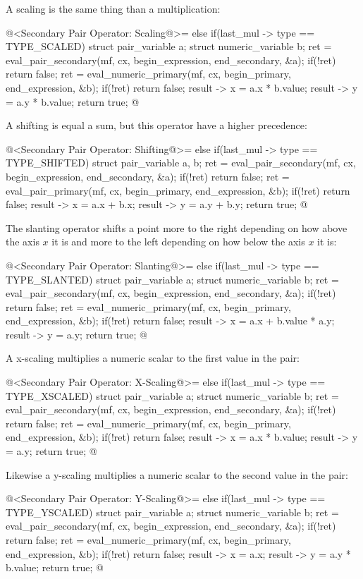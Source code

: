 A scaling is the same thing than a multiplication:

\iniciocodigo
@<Secondary Pair Operator: Scaling@>=
else if(last_mul -> type == TYPE_SCALED){
  struct pair_variable a;
  struct numeric_variable b;
  ret = eval_pair_secondary(mf, cx, begin_expression, end_secondary, &a);
  if(!ret)
    return false;
  ret = eval_numeric_primary(mf, cx, begin_primary, end_expression, &b);
  if(!ret)
    return false;
  result -> x = a.x * b.value;
  result -> y = a.y * b.value;
  return true;
}
@
\fimcodigo

A shifting is equal a sum, but this operator have a higher precedence:

\iniciocodigo
@<Secondary Pair Operator: Shifting@>=
else if(last_mul -> type == TYPE_SHIFTED){
  struct pair_variable a, b;
  ret = eval_pair_secondary(mf, cx, begin_expression, end_secondary, &a);
  if(!ret)
    return false;
  ret = eval_pair_primary(mf, cx, begin_primary, end_expression, &b);
  if(!ret)
    return false;
  result -> x = a.x + b.x;
  result -> y = a.y + b.y;
  return true;
}
@
\fimcodigo

The slanting operator shifts a point more to the right depending on
how above the axis $x$ it is and more to the left depending on how
below the axis $x$ it is:

\iniciocodigo
@<Secondary Pair Operator: Slanting@>=
else if(last_mul -> type == TYPE_SLANTED){
  struct pair_variable a;
  struct numeric_variable b;
  ret = eval_pair_secondary(mf, cx, begin_expression, end_secondary, &a);
  if(!ret)
    return false;
  ret = eval_numeric_primary(mf, cx, begin_primary, end_expression, &b);
  if(!ret)
    return false;
  result -> x = a.x + b.value * a.y;
  result -> y = a.y;
  return true;
}
@
\fimcodigo

A x-scaling multiplies a numeric scalar to the first value in the
pair:

\iniciocodigo
@<Secondary Pair Operator: X-Scaling@>=
else if(last_mul -> type == TYPE_XSCALED){
  struct pair_variable a;
  struct numeric_variable b;
  ret = eval_pair_secondary(mf, cx, begin_expression, end_secondary, &a);
  if(!ret)
    return false;
  ret = eval_numeric_primary(mf, cx, begin_primary, end_expression, &b);
  if(!ret)
    return false;
  result -> x = a.x * b.value;
  result -> y = a.y;
  return true;
}
@
\fimcodigo

Likewise a y-scaling multiplies a numeric scalar to the second value
in the pair:

\iniciocodigo
@<Secondary Pair Operator: Y-Scaling@>=
else if(last_mul -> type == TYPE_YSCALED){
  struct pair_variable a;
  struct numeric_variable b;
  ret = eval_pair_secondary(mf, cx, begin_expression, end_secondary, &a);
  if(!ret)
    return false;
  ret = eval_numeric_primary(mf, cx, begin_primary, end_expression, &b);
  if(!ret)
    return false;
  result -> x = a.x;
  result -> y = a.y * b.value;
  return true;
}
@
\fimcodigo

